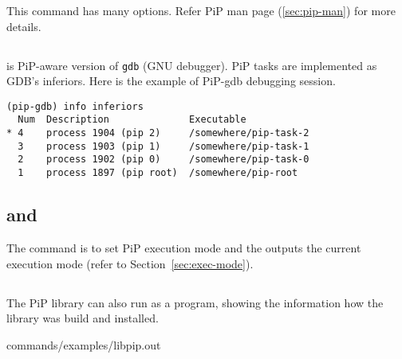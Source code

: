 This  command has many options. Refer PiP man page
(\ref{sec:pip-man}) for more details. 

\subsection{}\label{sec:pip-gdb}

 is PiP-aware version of {\tt gdb} (GNU
debugger). PiP tasks are implemented as GDB's inferiors. Here is the
example of PiP-gdb debugging session.

\begin{lstlisting}[frame=tRBl]
(pip-gdb) info inferiors
  Num  Description              Executable
* 4    process 1904 (pip 2)     /somewhere/pip-task-2
  3    process 1903 (pip 1)     /somewhere/pip-task-1
  2    process 1902 (pip 0)     /somewhere/pip-task-0
  1    process 1897 (pip root)  /somewhere/pip-root
\end{lstlisting}

\subsection{ and }

The  command is to set PiP execution mode and the
 outputs the current execution mode (refer to
Section~\ref{sec:exec-mode}). 

\subsection{}

The PiP library  can also run as a program, showing the
information how the library was build and installed.


                {commands/examples/libpip.out}
